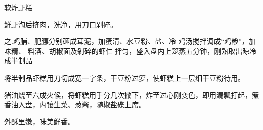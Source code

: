 \begin{recipe}{软炸虾糕}

\ingredients


\cooking

\step 鲜虾淘后挤肉，洗净，用刀口剁碎。

之.鸡脯、肥膘分别砸成茸泥，加蛋清、水豆粉、盐、冷 鸡汤搅拌调成“鸡糁”，加味精、
料酒、胡椒面及剁碎的虾仁 拌匀，盛入盘内上笼蒸五分钟，刚熟取出晾冷成半制品

\step 将半制品虾糕用刀切成宽一字条，干豆粉过箩，使虾糕上一层细干豆粉待用。

\step 猪油烧至六成火候，将虾糕用手分几次撒下，炸至过心刚变色，即用漏瓢打起，簸
香油入盘，内镶生菜、葱酱，随椒盐碟上席。

\features

外酥里嫩，味美鲜香。

\end{recipe}


